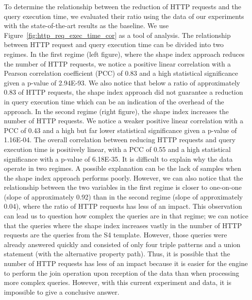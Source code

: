 To determine the relationship between the reduction of HTTP requests and the query execution time, we evaluated their ratio using 
the data of our experiments with the state-of-the-art results as the baseline.
We use Figure~\ref{fig:http_req_exec_time_cor} as a tool of analysis.
The relationship between HTTP request and query execution time can be divided into two regimes.
In the first regime (left figure), where the shape index approach reduces the number of HTTP requests, we notice a positive linear correlation with a
Pearson correlation coefficient (PCC) of 0.83 and a high statistical significance given a p-value of 2.94E-93.
We also notice that below a ratio of approximately 0.83 of HTTP requests, the shape index approach did not guarantee a reduction in query execution time
which can be an indication of the overhead of the approach.
In the second regime (right figure), the shape index increases the number of HTTP requests.
We notice a weaker positive linear correlation with a PCC of 0.43 and a high but far lower statistical significance given a p-value of 1.16E-04.
The overall correlation between reducing HTTP requests and query execution time is positively linear, with a PCC of 0.55 and a high statistical significance with a p-value of 6.18E-35.
It is difficult to explain why the data operate in two regimes. 
A possible explanation can be the lack of samples when the shape index approach performs poorly.
However, we can also notice that the relationship between the two variables in the first regime is closer to one-on-one (slope of approximately 0.92) than in the second regime (slope of approximately 0.04), where the ratio of HTTP requests has less of an impact.
This observation can lead us to question how complex the queries are in that regime; we can notice that the queries where the shape index increases vastly in the number 
of HTTP requests are the queries from the S4 template. 
However, those queries were already answered quickly and consisted of only four triple patterns and a union statement (with the alternative property path). 
Thus, it is possible that the number of HTTP requests has less of an impact because it is easier for the engine to perform the join operation upon reception of the data than when processing more complex queries.
However, with this current experiment and data, it is impossible to give a conclusive answer.

